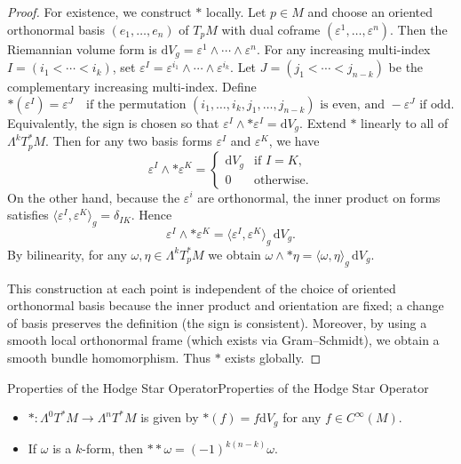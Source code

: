 \documentclass[../main.tex]{subfiles}
\begin{document}
\begin{proof}
  For existence, we construct $*$ locally. Let $p \in M$ and choose an oriented orthonormal basis $(e_1,\dots,e_n)$ of $T_pM$ with dual coframe $(\varepsilon^1,\dots,\varepsilon^n)$. Then the Riemannian volume form is $\mathrm{d}V_g = \varepsilon^1 \wedge \cdots \wedge \varepsilon^n$. For any increasing multi-index $I = (i_1 < \cdots < i_k)$, set $\varepsilon^I = \varepsilon^{i_1} \wedge \cdots \wedge \varepsilon^{i_k}$. Let $J = (j_1 < \cdots < j_{n-k})$ be the complementary increasing multi-index. Define
  \begin{equation*}
  *(\varepsilon^I) = \varepsilon^J \quad \text{if the permutation } (i_1,\dots,i_k,j_1,\dots,j_{n-k}) \text{ is even, and } -\varepsilon^J \text{ if odd.}
  \end{equation*}
  Equivalently, the sign is chosen so that $\varepsilon^I \wedge *\varepsilon^I = \mathrm{d}V_g$. Extend $*$ linearly to all of $\Lambda^k T_p^*M$. Then for any two basis forms $\varepsilon^I$ and $\varepsilon^K$, we have
  \begin{equation*}
  \varepsilon^I \wedge *\varepsilon^K = 
  \begin{cases}
  \mathrm{d}V_g & \text{if } I = K, \\
  0 & \text{otherwise.}
  \end{cases}
  \end{equation*}
  On the other hand, because the $\varepsilon^i$ are orthonormal, the inner product on forms satisfies $\langle \varepsilon^I, \varepsilon^K \rangle_g = \delta_{IK}$. Hence
  \begin{equation*}
  \varepsilon^I \wedge *\varepsilon^K = \langle \varepsilon^I, \varepsilon^K \rangle_g \, \mathrm{d}V_g.
  \end{equation*}
  By bilinearity, for any $\omega, \eta \in \Lambda^k T_p^*M$ we obtain $\omega \wedge *\eta = \langle \omega, \eta\rangle_g \, \mathrm{d}V_g$.

  This construction at each point is independent of the choice of oriented orthonormal basis because the inner product and orientation are fixed; a change of basis preserves the definition (the sign is consistent). Moreover, by using a smooth local orthonormal frame (which exists via Gram–Schmidt), we obtain a smooth bundle homomorphism. Thus $*$ exists globally.
\end{proof}

\begin{proposition}{Properties of the Hodge Star Operator}{Properties of the Hodge Star Operator}
  \begin{itemize}
    \item $*: \Lambda^0 T^*M \to \Lambda^n T^*M$ is given by $*(f) = f \mathrm{d} V_g$ for any $f \in C^\infty (M)$.
    \item If $\omega$ is a $k$-form, then $**\omega = (-1)^{k(n-k)} \omega$.
  \end{itemize}  
\end{proposition}
\end{document}

